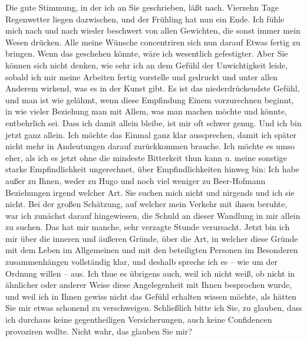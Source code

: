 \pstart
           Die gute Stimmung, in der ich \label{K_L03266-3v}\label{K_L03266-3} an Sie geschrieben, läßt nach. Vierzehn Tage Regenwetter liegen dazwischen,
               und der Frühling hat nun ein Ende. Ich fühle mich nach und nach wieder beschwert von
               allen Gewichten, die sonst immer mein Wesen drücken. Alle meine Wünsche concentriren
               sich nun darauf Etwas fertig zu bringen. Wenn das geschehen könnte, wäre ich
               wesentlich gefestigter. Aber Sie können sich nicht denken, wie sehr ich an dem Gefühl
               der Unwichtigkeit leide, sobald ich mir meine {\pb}Arbeiten fertig vorstelle und
               gedruckt und unter allen Anderem wirkend, was es in der Kunst gibt. Es ist das
               niederdrückendste Gefühl, und man ist wie gelähmt, wenn diese Empfindung Einem
               vorzurechnen beginnt, in wie vieler Beziehung man mit Allem, was man machen möchte
               und könnte, entbehrlich sei. Dass ich damit allein bleibe, ist mir oft schwer genug.
               Und ich bin jetzt ganz allein. Ich möchte das Einmal ganz klar aussprechen, damit ich
               später nicht mehr in Andeutungen darauf zurückkommen brauche. Ich möchte es umso
               eher, als ich es jetzt ohne die mindeste Bitterkeit thun kann u. meine sonstige
               starke Empfindlichkeit ungerechnet, über Empfindlichkeiten hinweg bin: Ich habe außer
               zu Ihnen, weder zu Hugo und noch viel weniger
               zu Beer-Hofmann Beziehungen irgend welcher
               Art. Sie suchen mich nicht und nirgends und ich sie nicht. {\pb}Bei der großen Schätzung, auf
               welcher mein Verkehr mit ihnen beruhte, war ich zunächst darauf hingewiesen, die
               Schuld an dieser Wandlung in mir allein zu suchen. Das hat mir manche, sehr verzagte
               Stunde verursacht. Jetzt bin ich mir über die inneren und äußeren Gründe, über die
               Art, in welcher diese Gründe mit dem Leben im Allgemeinen und mit den \introOben{}beteiligten\introOben{} Personen im Besonderen zusammenhängen vollständig
               klar, und deshalb spreche ich es – wie um der Ordnung willen – aus. Ich thue \introOben{}es\introOben{} übrigens auch, weil ich nicht weiß, ob nicht in ähnlicher
               oder anderer Weise diese Angelegenheit mit Ihnen besprochen wurde, und weil ich in
               Ihnen gewiss nicht das Gefühl erhalten wissen möchte, als hätten Sie mir etwas
               schonend zu verschweigen. Schließlich bitte ich Sie, zu glauben, dass ich durchaus
               keine gegentheiligen Versicherungen, auch keine Confidencen provoziren wollte. Nicht
               wahr, das glauben Sie mir?\pend
           
